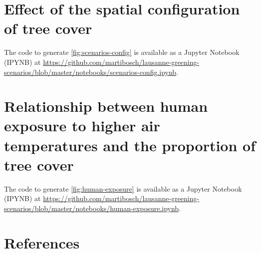 \documentclass[12pt]{iopart}
\begin{document}
\section{Effect of the spatial configuration of tree cover}
\label{sec:effect-config}

The code to generate \autoref{fig:scenarios-config} is available as a Jupyter Notebook (IPYNB) at \url{https://github.com/martibosch/lausanne-greening-scenarios/blob/master/notebooks/scenarios-config.ipynb}.


\section{Relationship between human exposure to higher air temperatures and the proportion of tree cover}
\label{sec:human-exposure}


The code to generate \autoref{fig:human-exposure} is available as a Jupyter Notebook (IPYNB) at \url{https://github.com/martibosch/lausanne-greening-scenarios/blob/master/notebooks/human-exposure.ipynb}.


\section*{References}



\end{document}
